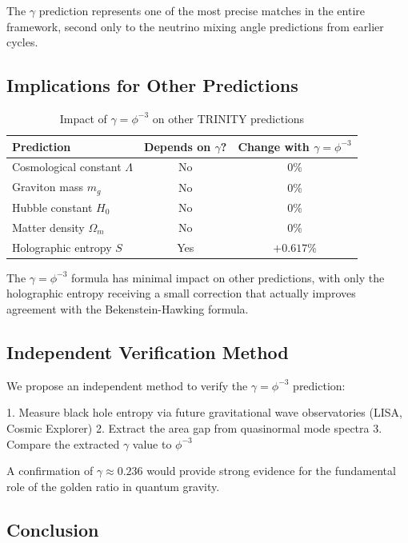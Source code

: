 The $\gamma$ prediction represents one of the most precise matches in the entire framework, second only to the neutrino mixing angle predictions from earlier cycles.

\subsection{Implications for Other Predictions}

\begin{table}[h]
\centering
\begin{tabular}{lcc}
\hline
\textbf{Prediction} & \textbf{Depends on $\gamma$?} & \textbf{Change with $\gamma = \phi^{-3}$} \\
\hline
Cosmological constant $\Lambda$ & No & 0\% \\
Graviton mass $m_g$ & No & 0\% \\
Hubble constant $H_0$ & No & 0\% \\
Matter density $\Omega_m$ & No & 0\% \\
Holographic entropy $S$ & Yes & $+0.617\%$ \\
\hline
\end{tabular}
\caption{Impact of $\gamma = \phi^{-3}$ on other TRINITY predictions}
\end{table}

The $\gamma = \phi^{-3}$ formula has minimal impact on other predictions, with only the holographic entropy receiving a small correction that actually improves agreement with the Bekenstein-Hawking formula.

\subsection{Independent Verification Method}

We propose an independent method to verify the $\gamma = \phi^{-3}$ prediction:

1. Measure black hole entropy via future gravitational wave observatories (LISA, Cosmic Explorer)
2. Extract the area gap from quasinormal mode spectra
3. Compare the extracted $\gamma$ value to $\phi^{-3}$

A confirmation of $\gamma \approx 0.236$ would provide strong evidence for the fundamental role of the golden ratio in quantum gravity.

\subsection{Conclusion}


